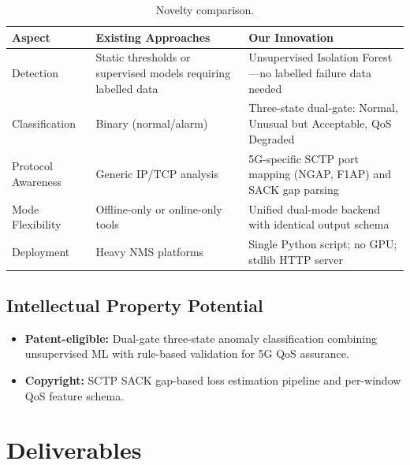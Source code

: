 \documentclass[11pt, a4paper]{article}
\begin{document}
\begin{table}[H]
\centering
\begin{tabular}{p{3cm} p{4.5cm} p{4.5cm}}
\toprule
\textbf{Aspect} & \textbf{Existing Approaches} & \textbf{Our Innovation} \\
\midrule
Detection        & Static thresholds or supervised models requiring labelled data & Unsupervised Isolation Forest---no labelled failure data needed \\
Classification   & Binary (normal/alarm) & Three-state dual-gate: Normal, Unusual but Acceptable, QoS Degraded \\
Protocol Awareness & Generic IP/TCP analysis & 5G-specific SCTP port mapping (NGAP, F1AP) and SACK gap parsing \\
Mode Flexibility & Offline-only or online-only tools & Unified dual-mode backend with identical output schema \\
Deployment       & Heavy NMS platforms & Single Python script; no GPU; stdlib HTTP server \\
\bottomrule
\end{tabular}
\caption{Novelty comparison.}
\label{tab:novelty}
\end{table}

\subsection{Intellectual Property Potential}

\begin{itemize}
    \item \textbf{Patent-eligible:} Dual-gate three-state anomaly classification combining unsupervised ML with rule-based validation for 5G QoS assurance.
    \item \textbf{Copyright:} SCTP SACK gap-based loss estimation pipeline and per-window QoS feature schema.
\end{itemize}

\section{Deliverables}
\end{document}
